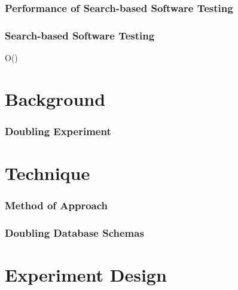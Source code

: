\documentclass[hyperref]{beamer}
\begin{document}
\begin{frame}
  \frametitle{Performance of Search-based Software Testing}
   
   
\end{frame}

\begin{frame}
    \frametitle{Search-based Software Testing}
    \begin{center}
  \fontsize{60}{72}\selectfont
  O()
  \end{center}
  
\end{frame}

  \section{Background}

    \begin{frame}
      \frametitle{Doubling Experiment}
    \end{frame}

    \section{Technique}
      \begin{frame}
          \frametitle{Method of Approach}
          \centering
          
          
      \end{frame}

      \begin{frame}
        \frametitle{Doubling Database Schemas}
        \centering
        
        
      \end{frame}

    \section{Experiment Design}
\end{document}
